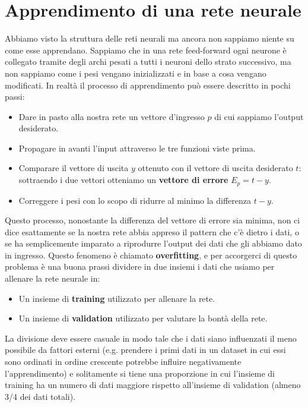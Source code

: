 \documentclass[12pt, twoside, letterpaper]{report}
\begin{document}
		\section{Apprendimento di una rete neurale}
			Abbiamo visto la struttura delle reti neurali ma ancora non sappiamo niente su come esse apprendano. Sappiamo che in una rete feed-forward ogni neurone è collegato tramite degli archi pesati a tutti i neuroni dello strato successivo, ma non sappiamo come i pesi vengano inizializzati e in base a cosa vengano modificati. In realtà il processo di apprendimento può essere descritto in pochi passi: 
			\begin{itemize}
				\item Dare in pasto alla nostra rete un vettore d'ingresso $p$ di cui sappiamo l'output desiderato.
				\item Propagare in avanti l'input attraverso le tre funzioni viste prima.
				\item Comparare il vettore di uscita $y$ ottenuto con il vettore di uscita desiderato $t$: sottraendo i due vettori otteniamo un \textbf{vettore di errore} $E_p = t - y$.
				\item Correggere i pesi con lo scopo di ridurre al minimo la differenza $t-y$. 
			\end{itemize}
			Questo processo, nonostante la differenza del vettore di errore sia minima, non ci dice esattamente se la nostra rete abbia appreso il pattern che c'è dietro i dati, o se ha semplicemente imparato a riprodurre l'output dei dati che gli abbiamo dato in ingresso. Questo fenomeno è chiamato \textbf{overfitting}, e per accorgerci di questo problema è una buona prassi dividere in due insiemi i dati che usiamo per allenare la rete neurale in: 
			\begin{itemize}
				\item Un insieme di \textbf{training} utilizzato per allenare la rete.
				\item Un insieme di \textbf{validation} utilizzato per valutare la bontà della rete.
			\end{itemize}
			La divisione deve essere casuale in modo tale che i dati siano influenzati il meno possibile da fattori esterni (e.g. prendere i primi dati in un dataset in cui essi sono ordinati in ordine crescente potrebbe influire negativamente l'apprendimento) e solitamente si tiene una proporzione in cui l'insieme di training ha un numero di dati maggiore rispetto all'insieme di validation (almeno 3/4 dei dati totali). 
			
\end{document}
